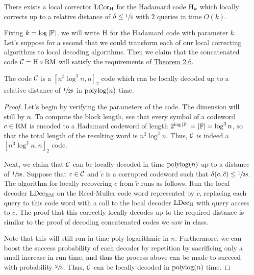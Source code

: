\documentclass[11pt]{article}
\begin{document}
\begin{claim}{2.2}
    There exists a local corrector ${\textup{LCor}}_{\mathrm{H}}$ for the Hadamard code $\mathrm{H}_k$ which locally corrects up to a relative distance of $\delta \leq \sfrac{1}{4}$ with $2$ queries in time $O(k)$.
\end{claim}

Fixing $k = \log |\mathbb{F}|$, we will write $\mathrm{H}$ for the Hadamard code with parameter $k$. Let's suppose for a second that we could transform each of our local correcting algorithms to local decoding algorithms. Then we claim that the concatenated code $\mathcal{C} = \mathrm{H} \diamond \mathrm{RM}$ will satisfy the requirements of \hyperref[t-2-6]{Theorem 2.6}.

\begin{claim}{2.3}
    The code $\mathcal{C}$ is a $[n^3\log^3 n, n]_2$ code which can be locally decoded up to a relative distance of $\sfrac{1}{28}$ in $\mathrm{polylog}(n)$ time.
\end{claim}

\begin{proof}
    Let's begin by verifying the parameters of the code. The dimension will still by $n$. To compute the block length, see that every symbol of a codeword $c \in \mathrm{RM}$ is encoded to a Hadamard codeword of length $2^{\log |\mathbb{F}|} = |\mathbb{F}| = \log^3 n$, so that the total length of the resulting word is $n^3 \log^3 n$. Thus, $\mathcal{C}$ is indeed a $[n^3 \log^3 n, n]_2$ code.

    Next, we claim that $\mathcal{C}$ can be locally decoded in time $\mathrm{polylog}(n)$ up to a distance of $\sfrac{1}{28}$. Suppose that $c \in \mathcal{C}$ and $\tilde{c}$ is a corrupted codeword such that $\delta(c, \tilde{c}) \leq \sfrac{1}{28}$. The algorithm for locally recovering $c$ from $\tilde{c}$ runs as follows. Run the local decoder ${\textup{LDec}}_{\mathrm{RM}}$ on the Reed-Muller code word represented by $\tilde{c}$, replacing each query to this code word with a call to the local decoder ${\textup{LDec}}_{\mathrm{H}}$ with query access to $\tilde{c}$. The proof that this correctly locally decodes up to the required distance is similar to the proof of decoding concatenated codes we saw in class.
    
    Note that this will still run in time poly-logarithmic in $n$. Furthermore, we can boost the success probability of each decoder by repetition by sacrificing only a small increase in run time, and thus the process above can be made to succeed with probability $\sfrac{2}{3}$. Thus, $\mathcal{C}$ can be locally decoded in $\mathrm{polylog}(n)$ time.
\end{proof}
\end{document}
